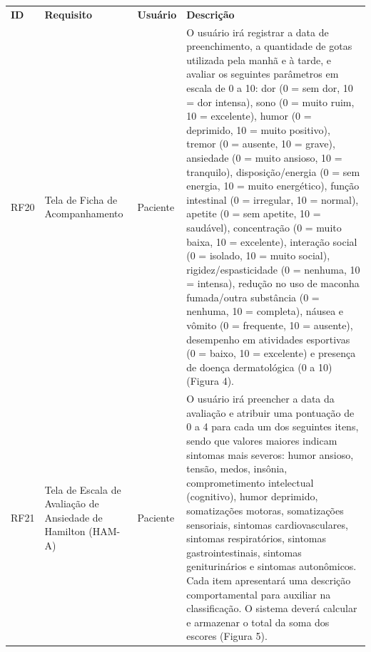 \href{}{}\documentclass[12pt,portuguese,oneside]{article}
\begin{document}
\newpage

\begin{table}[H]
\centering
{}
\begin{tabularx}{\textwidth}{|>{\raggedright\arraybackslash}p{1cm}|>{\raggedright\arraybackslash}p{3cm}|>{\raggedright\arraybackslash}p{2cm}|>{\raggedright\arraybackslash}X|}
\hline
\rowcolor{gray!20}
\textbf{ID} & \textbf{Requisito} & \textbf{Usuário} & \textbf{Descrição}\\
RF20 & Tela de Ficha de Acompanhamento & Paciente & O usuário irá registrar a data de preenchimento, a quantidade de gotas utilizada pela manhã e à tarde, e avaliar os seguintes parâmetros em escala de 0 a 10: dor (0 = sem dor, 10 = dor intensa), sono (0 = muito ruim, 10 = excelente), humor (0 = deprimido, 10 = muito positivo), tremor (0 = ausente, 10 = grave), ansiedade (0 = muito ansioso, 10 = tranquilo), disposição/energia (0 = sem energia, 10 = muito energético), função intestinal (0 = irregular, 10 = normal), apetite (0 = sem apetite, 10 = saudável), concentração (0 = muito baixa, 10 = excelente), interação social (0 = isolado, 10 = muito social), rigidez/espasticidade (0 = nenhuma, 10 = intensa), redução no uso de maconha fumada/outra substância (0 = nenhuma, 10 = completa), náusea e vômito (0 = frequente, 10 = ausente), desempenho em atividades esportivas (0 = baixo, 10 = excelente) e presença de doença dermatológica (0 a 10) (Figura 4).\\
\hline
RF21 & Tela de Escala de Avaliação de Ansiedade de Hamilton (HAM-A) & Paciente & O usuário irá preencher a data da avaliação e atribuir uma pontuação de 0 a 4 para cada um dos seguintes itens, sendo que valores maiores indicam sintomas mais severos: humor ansioso, tensão, medos, insônia, comprometimento intelectual (cognitivo), humor deprimido, somatizações motoras, somatizações sensoriais, sintomas cardiovasculares, sintomas respiratórios, sintomas gastrointestinais, sintomas geniturinários e sintomas autonômicos. Cada item apresentará uma descrição comportamental para auxiliar na classificação. O sistema deverá calcular e armazenar o total da soma dos escores (Figura 5).\\
\hline
\end{tabularx}
\end{table}

\newpage
\end{document}

